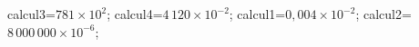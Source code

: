 \documentclass[exercice]{thedocument}%
\begin{document}
%
    \>calcul3=$781\times 10^2$;%
    \>calcul4=$4\,120\times 10^{-2}$;%
    \>calcul1=$0,004\times 10^{-2}$;%
    \>calcul2=$8\,000\,000\times 10^{-6}$;%
\end{document}
